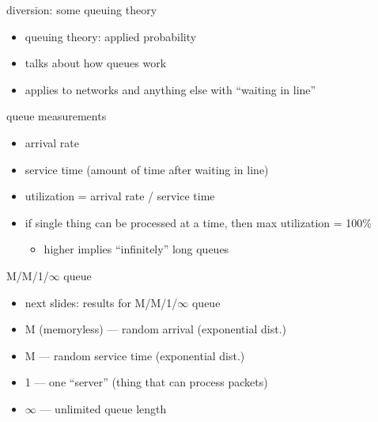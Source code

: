 \begin{frame}{diversion: some queuing theory}
    \begin{itemize}
    \item queuing theory: applied probability
    \item talks about how queues work
    \vspace{.5cm}
    \item applies to networks and anything else with ``waiting in line''
    \end{itemize}
\end{frame}

\begin{frame}{queue measurements}
    \begin{itemize}
    \item arrival rate
    \item service time (amount of time after waiting in line)
    \item utilization = arrival rate / service time
    \vspace{.5cm}
    \item if single thing can be processed at a time, then max utilization = 100\%
        \begin{itemize}
        \item higher implies ``infinitely'' long queues
        \end{itemize}
    \end{itemize}
\end{frame}

\begin{frame}{M/M/1/$\infty$ queue}
    \begin{itemize}
    \item next slides: results for M/M/1/$\infty$ queue
    \vspace{.5cm}
    \item M (memoryless) --- random arrival (exponential dist.)
    \item M --- random service time (exponential dist.)
    \item 1 --- one ``server'' (thing that can process packets)
    \item $\infty$ --- unlimited queue length
    \end{itemize}
\end{frame}

